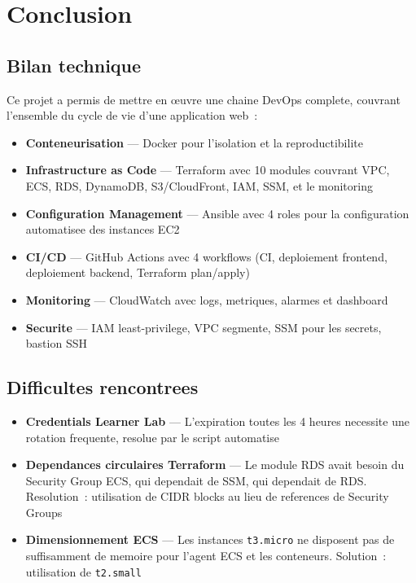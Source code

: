 \chapter{Conclusion}

\section{Bilan technique}

Ce projet a permis de mettre en \oe{}uvre une chaine DevOps complete,
couvrant l'ensemble du cycle de vie d'une application web~:

\begin{itemize}
    \item \textbf{Conteneurisation} --- Docker pour l'isolation et la reproductibilite
    \item \textbf{Infrastructure as Code} --- Terraform avec 10 modules couvrant VPC,
        ECS, RDS, DynamoDB, S3/CloudFront, IAM, SSM, et le monitoring
    \item \textbf{Configuration Management} --- Ansible avec 4 roles pour la configuration
        automatisee des instances EC2
    \item \textbf{CI/CD} --- GitHub Actions avec 4 workflows (CI, deploiement frontend,
        deploiement backend, Terraform plan/apply)
    \item \textbf{Monitoring} --- CloudWatch avec logs, metriques, alarmes et dashboard
    \item \textbf{Securite} --- IAM least-privilege, VPC segmente, SSM pour les secrets,
        bastion SSH
\end{itemize}

\section{Difficultes rencontrees}

\begin{itemize}
    \item \textbf{Credentials Learner Lab} --- L'expiration toutes les 4 heures
        necessite une rotation frequente, resolue par le script automatise
    \item \textbf{Dependances circulaires Terraform} --- Le module RDS avait besoin
        du Security Group ECS, qui dependait de SSM, qui dependait de RDS.
        Resolution~: utilisation de CIDR blocks au lieu de references de Security Groups
    \item \textbf{Dimensionnement ECS} --- Les instances \texttt{t3.micro} ne disposent
        pas de suffisamment de memoire pour l'agent ECS et les conteneurs.
        Solution~: utilisation de \texttt{t2.small}
\end{itemize}

